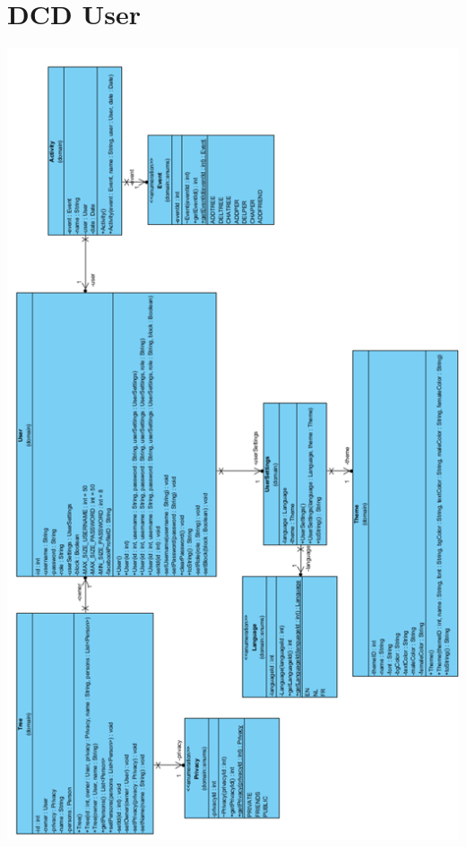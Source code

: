 \documentclass[pdftex,a4paper,12pt,twoside]{report}
\begin{document}
\section{DCD User}
\includegraphics[width=\textwidth, height=\textheight]{images/DCDUser.png}
\end{document}
